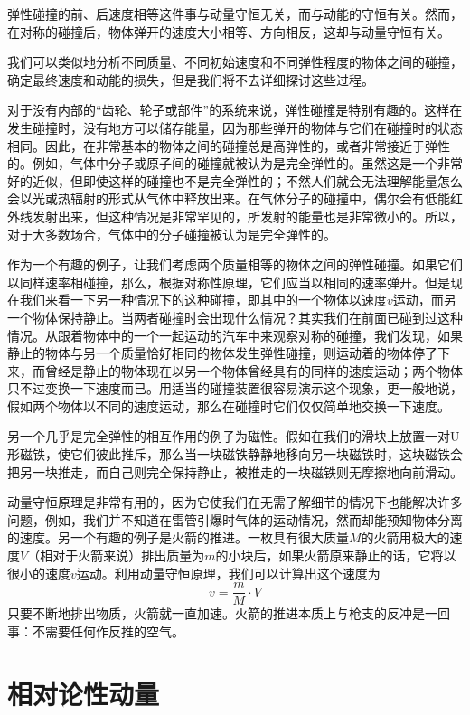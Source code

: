 弹性碰撞的前、后速度相等这件事与动量守恒无关，而与动能的守恒有关。然而，在对称的碰撞后，物体弹开的速度大小相等、方向相反，这却与动量守恒有关。

我们可以类似地分析不同质量、不同初始速度和不同弹性程度的物体之间的碰撞，确定最终速度和动能的损失，但是我们将不去详细探讨这些过程。

对于没有内部的“齿轮、轮子或部件”的系统来说，弹性碰撞是特别有趣的。这样在发生碰撞时，没有地方可以储存能量，因为那些弹开的物体与它们在碰撞时的状态相同。因此，在非常基本的物体之间的碰撞总是高弹性的，或者非常接近于弹性的。例如，气体中分子或原子间的碰撞就被认为是完全弹性的。虽然这是一个非常好的近似，但即使这样的碰撞也不是完全弹性的；不然人们就会无法理解能量怎么会以光或热辐射的形式从气体中释放出来。在气体分子的碰撞中，偶尔会有低能红外线发射出来，但这种情况是非常罕见的，所发射的能量也是非常微小的。所以，对于大多数场合，气体中的分子碰撞被认为是完全弹性的。

作为一个有趣的例子，让我们考虑两个质量相等的物体之间的弹性碰撞。如果它们以同样速率相碰撞，那么，根据对称性原理，它们应当以相同的速率弹开。但是现在我们来看一下另一种情况下的这种碰撞，即其中的一个物体以速度$v$运动，而另一个物体保持静止。当两者碰撞时会出现什么情况？其实我们在前面已碰到过这种情况。从跟着物体中的一个一起运动的汽车中来观察对称的碰撞，我们发现，如果静止的物体与另一个质量恰好相同的物体发生弹性碰撞，则运动着的物体停了下来，而曾经是静止的物体现在以另一个物体曾经具有的同样的速度运动；两个物体只不过变换一下速度而已。用适当的碰撞装置很容易演示这个现象，更一般地说，假如两个物体以不同的速度运动，那么在碰撞时它们仅仅简单地交换一下速度。

另一个几乎是完全弹性的相互作用的例子为磁性。假如在我们的滑块上放置一对U形磁铁，使它们彼此推斥，那么当一块磁铁静静地移向另一块磁铁时，这块磁铁会把另一块推走，而自己则完全保持静止，被推走的一块磁铁则无摩擦地向前滑动。

动量守恒原理是非常有用的，因为它使我们在无需了解细节的情况下也能解决许多问题，例如，我们并不知道在雷管引爆时气体的运动情况，然而却能预知物体分离的速度。另一个有趣的例子是火箭的推进。一枚具有很大质量$M$的火箭用极大的速度$V$（相对于火箭来说）排出质量为$m$的小块后，如果火箭原来静止的话，它将以很小的速度$v$运动。利用动量守恒原理，我们可以计算出这个速度为
\begin{equation*}
    v=\frac{m}{M} \cdot V
\end{equation*}
只要不断地排出物质，火箭就一直加速。火箭的推进本质上与枪支的反冲是一回事：不需要任何作反推的空气。

\section{相对论性动量}

